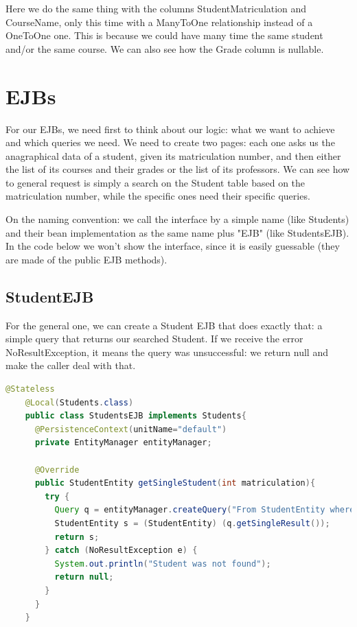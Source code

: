 \documentclass[12pt, a4paper]{article}
\begin{document}
  Here we do the same thing with the columns StudentMatriculation and CourseName, only this time with a ManyToOne relationship instead of a OneToOne one. This is because we could have many time the same student and/or the same course. We can also see how the Grade column is nullable.

  \pagebreak
  \section{EJBs}

  For our EJBs, we need first to think about our logic: what we want to achieve and which queries we need. We need to create two pages: each one asks us the anagraphical data of a student, given its matriculation number, and then either the list of its courses and their grades or the list of its professors. We can see how to general request is simply a search on the Student table based on the matriculation number, while the specific ones need their specific queries.

  On the naming convention: we call the interface by a simple name (like Students) and their bean implementation as the same name plus "EJB" (like StudentsEJB). In the code below we won't show the interface, since it is easily guessable (they are made of the public EJB methods).

  \subsection{StudentEJB}
  For the general one, we can create a Student EJB that does exactly that: a simple query that returns our searched Student. If we receive the error NoResultException, it means the query was unsuccessful: we return null and make the caller deal with that.
  
  \begin{lstlisting}[language=java, caption={StudentsEJB}]
    @Stateless
    @Local(Students.class)
    public class StudentsEJB implements Students{
      @PersistenceContext(unitName="default")
      private EntityManager entityManager;

      @Override
      public StudentEntity getSingleStudent(int matriculation){
        try {
          Query q = entityManager.createQuery("From StudentEntity where matriculation = " + matriculation);
          StudentEntity s = (StudentEntity) (q.getSingleResult());
          return s;
        } catch (NoResultException e) {
          System.out.println("Student was not found");
          return null;
        }
      }
    }
  \end{lstlisting}
\end{document}
